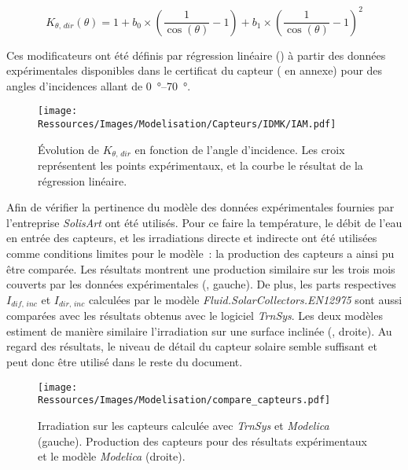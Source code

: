 \begin{equation}\label{eq:iam_dir_plan_model}
    K_{\theta,\,dir} (\theta) = 1 + b_{0} \times \left(\frac{1}{\cos(\theta)} - 1\right)
                                  + b_{1} \times \left(\frac{1}{\cos(\theta)} - 1\right)^{2}
\end{equation}

Ces modificateurs ont été définis par régression linéaire () à partir des données
expérimentales disponibles dans le certificat du capteur ( en annexe)
pour des angles d’incidences allant de \SIrange{0}{70}{\degree}.

\begin{figure}
    \centering
    \texttt{[image: Ressources/Images/Modelisation/Capteurs/IDMK/IAM.pdf]}
    \caption[ pour le rayonnement direct]
             {Évolution de $K_{\theta,\,dir}$ en fonction de l’angle d’incidence.
              Les croix représentent les points expérimentaux, et la courbe le résultat
              de la régression linéaire.}
    \label{fig:IAM_idmk}
\end{figure}

Afin de vérifier la pertinence du modèle des données expérimentales fournies par
l’entreprise \textit{SolisArt} ont été utilisés. Pour ce faire la température, le débit
de l’eau en entrée des capteurs, et les irradiations directe et indirecte ont été
utilisées comme conditions limites pour le modèle~: la production des capteurs a ainsi pu
être comparée. Les résultats montrent une production similaire sur les trois mois couverts
par les données expérimentales (, gauche). De plus, les
parts respectives $I_{dif,\,inc}$ et $I_{dir,\,inc}$ calculées par le modèle
\textit{Fluid.SolarCollectors.EN12975} sont aussi comparées avec les résultats obtenus avec
le logiciel \textit{TrnSys}. Les deux modèles estiment de manière similaire l’irradiation
sur une surface inclinée (, droite). Au regard des résultats,
le niveau de détail du capteur solaire semble suffisant et peut donc être utilisé dans le
reste du document.

\begin{figure}
    \centering
    \texttt{[image: Ressources/Images/Modelisation/compare\_capteurs.pdf]}
    \caption[Comparaisons de l’irradiation entre \textit{TrnSys}, \textit{Modelica} et des résultats expérimentaux]
             {Irradiation sur les capteurs calculée avec \textit{TrnSys} et \textit{Modelica} (gauche).
             Production des capteurs pour des résultats expérimentaux et le modèle \textit{Modelica} (droite).}
    \label{fig:compare_capteurs}
\end{figure}
\FloatBarrier


